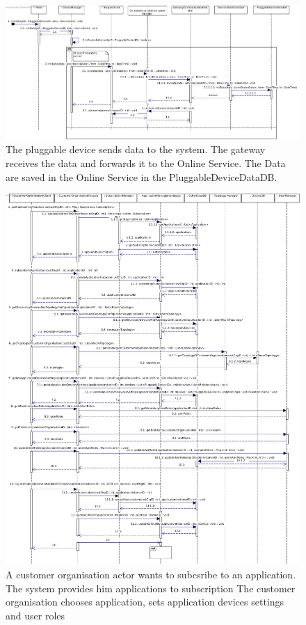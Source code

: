     \begin{figure}[!htp]
    	\centering
    	\includegraphics[width=\textwidth]{images/sequence-UC11}
    	\caption[Sensor data being processed by the system]{The pluggable device sends data to the system. The gateway receives the data and forwards it to the Online Service.
    	 The Data are saved in the Online Service in the PluggableDeviceDataDB. }\label{fig:seq_scenario1}
    \end{figure}

    \begin{figure}[!htp]
    	\centering
    	\includegraphics[width=\textwidth]{images/sequence-UC19}
    	\caption[ Subscribing to an application]{A customer organisation actor wants to subcsribe to an application. The system provides him applications to subscription
    	                        The customer organisation chooses application, sets application devices settings and user roles }\label{fig:seq_scenario2}
    \end{figure}

